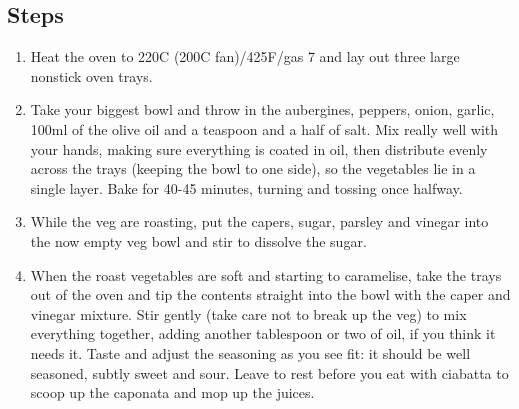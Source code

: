 \documentclass{book}
\begin{document}
\subsection*{Steps}
\begin{enumerate}
\item Heat the oven to 220C (200C fan)/425F/gas 7 and lay out three large nonstick oven trays.
\item Take your biggest bowl and throw in the aubergines, peppers, onion, garlic, 100ml of the olive oil and a teaspoon and a half of salt. Mix really well with your hands, making sure everything is coated in oil, then distribute evenly across the trays (keeping the bowl to one side), so the vegetables lie in a single layer. Bake for 40-45 minutes, turning and tossing once halfway.
\item While the veg are roasting, put the capers, sugar, parsley and vinegar into the now empty veg bowl and stir to dissolve the sugar.
\item When the roast vegetables are soft and starting to caramelise, take the trays out of the oven and tip the contents straight into the bowl with the caper and vinegar mixture. Stir gently (take care not to break up the veg) to mix everything together, adding another tablespoon or two of oil, if you think it needs it. Taste and adjust the seasoning as you see fit: it should be well seasoned, subtly sweet and sour. Leave to rest before you eat with ciabatta to scoop up the caponata and mop up the juices.
\end{enumerate}
\newpage
\end{document}
